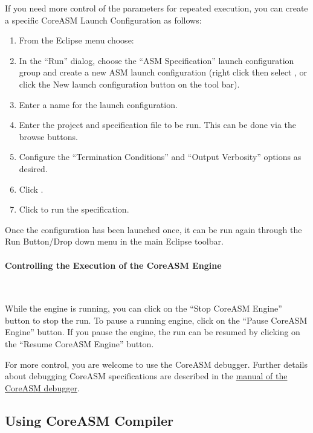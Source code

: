 \documentclass{article}
\newcommand{\CoreASM}{{\sffamily CoreASM}\xspace}
\begin{document}

If you need more control of the parameters for repeated execution, 
you can create a specific \CoreASM Launch Configuration as follows:

\begin{enumerate}
    \item From the Eclipse menu choose: 
	\item In the ``Run'' dialog, choose the ``ASM Specification'' launch configuration
group and create a new ASM launch configuration (right click then select , or
click the New launch configuration button on the tool bar).
    \item Enter a name for the launch configuration.
    \item Enter the project and specification file to be run. This can be done via the browse buttons.
    \item Configure the ``Termination Conditions'' and ``Output Verbosity'' options as desired.
    \item Click .
    \item Click  to run the specification. 
\end{enumerate}

Once the configuration has been launched once, it can be run again through the Run Button/Drop down menu in the main Eclipse toolbar.

\paragraph{Controlling the Execution of the \CoreASM Engine} ~

While the engine is running, you can click on the 
``Stop CoreASM Engine'' button to stop the run. To pause a running engine, 
click on the ``Pause CoreASM Engine'' button. If you pause the engine, the 
run can be resumed by clicking on the ``Resume CoreASM Engine'' button. 

For more control, you are welcome to use the CoreASM debugger. Further details about debugging CoreASM specifications are described in the \href{https://github.com/CoreASM/coreasm.core/blob/master/org.coreasm.eclipse/rsc/doc/CoreASM_Eclipse_Debugger_Manual.pdf?raw=true}{manual of the CoreASM debugger}.

\subsection{Using \CoreASM Compiler}
\end{document}
